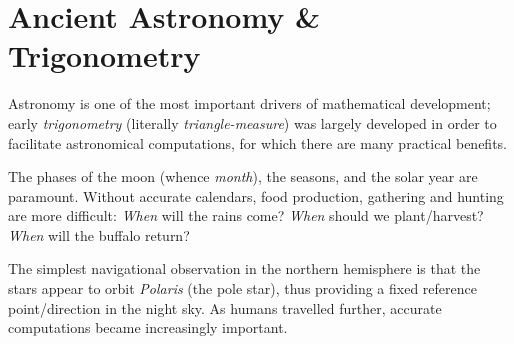 \graphicspath{{4astro/asy/}}

\section{Ancient Astronomy \& Trigonometry}

Astronomy is one of the most important drivers of mathematical development; early \emph{trigonometry} (literally \emph{triangle-measure}) was largely developed in order to facilitate astronomical computations, for which there are many practical benefits.
\begin{description}\itemsep0pt
	\item[\normalfont\emph{Calendars}] The phases of the moon (whence \emph{month}), the seasons, and the solar year are paramount. Without accurate calendars, food production, gathering and hunting are more difficult: \emph{When} will the rains come? \emph{When} should we plant/harvest? \emph{When} will the buffalo return? 
	\item[\normalfont\emph{Navigation}] The simplest navigational observation in the northern hemisphere is that the stars appear to orbit \emph{Polaris} (the pole star), thus providing a fixed reference point/direction in the night sky. As humans travelled further, accurate computations became increasingly important.
\end{description}


